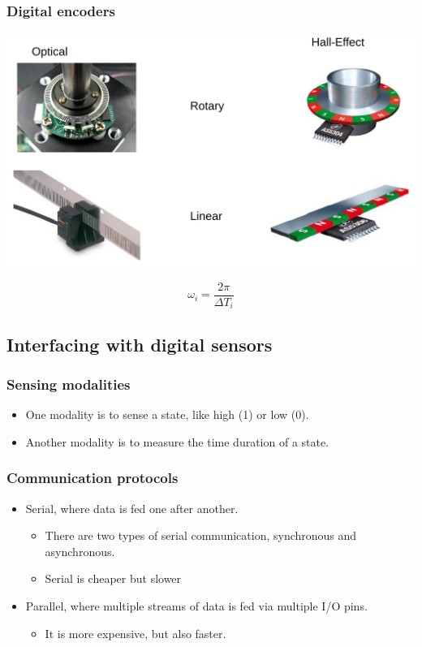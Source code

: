 \documentclass[11pt]{article}
\begin{document}
\subsubsection{Digital encoders}
\label{sec:org2683065}
\begin{center}
\includegraphics[width=.9\linewidth]{./images/digital-encoders.png}
\end{center}
  \[\omega_i = \frac{2 \pi}{\Delta T_i}\]
\subsection{Interfacing with digital sensors}
\label{sec:orge232851}

\subsubsection{Sensing modalities}
\label{sec:org9af6591}
\begin{itemize}
\item One modality is to sense a state, like high (1) or low (0).
\item Another modality is to measure the time duration of a state.
\end{itemize}
\subsubsection{Communication protocols}
\label{sec:org71be9df}
\begin{itemize}
\item Serial, where data is fed one after another.
\begin{itemize}
\item There are two types of serial communication, synchronous and asynchronous.
\item Serial is cheaper but slower
\end{itemize}
\item Parallel, where multiple streams of data is fed via multiple I/O pins.
\begin{itemize}
\item It is more expensive, but also faster.
\end{itemize}
\end{itemize}
\end{document}
